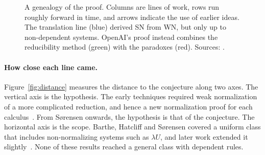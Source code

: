 \documentclass[10pt]{article}
\begin{document}
\begin{figure}[H]
\caption{A genealogy of the proof. Columns are lines of work, rows run roughly
forward in time, and arrows indicate the use of earlier ideas. The translation line
(blue) derived SN from WN, but only up to non-dependent systems. OpenAI's proof
instead combines the reducibility method (green) with the paradoxes (red). Sources:
\cite{ChurchRosser1936,BBKV1976,Klop1980,BergstraKlop1982,vanRaamsdonkEtAl1999,
KetemaKlopvanOostrom2004,Nederpelt1973,Karr1985,Khasidashvili1988,deGroote1993,
Geuvers1993,TLCAProblem9,CoquandHerbelin1994,KfouryWells1995,Loader1995,
Sorensen1997IC,Xi1997,BHS1999,BartheHatcliffSorensen2001,RouxVanDoorn2014,
MullThunk2022,Mull2023,Roux2025,Tait1967,Girard1972,Luo1990,GeuversNederhof1991,
HarperHonsellPlotkin1993,MelliesWerner1998,Coquand1986,Coquand1994,Hurkens1995,
BartheCoquand2006,Geuvers2007,Geuvers1992,GeuversWerner1994,Ghani1997,Barthe1999,
OpenAI2026,PTSbetaetaLean}.}
\label{fig:genealogy}
\end{figure}

\paragraph{How close each line came.} Figure~\ref{fig:distance} measures the
distance to the conjecture along two axes. The vertical axis is the hypothesis. The
early techniques required weak normalization of a more complicated reduction, and
hence a new normalization proof for each calculus~\cite[Ch.~2]{Sorensen1997}. From
Sørensen onwards, the hypothesis is that of the conjecture. The horizontal axis is
the scope. Barthe, Hatcliff and Sørensen covered a uniform class that includes
non-normalizing systems such as $\lambda U$, and later work extended it
slightly~\cite{Mull2023,RouxVanDoorn2014}. None of these results reached a general
class with dependent rules.
\end{document}
